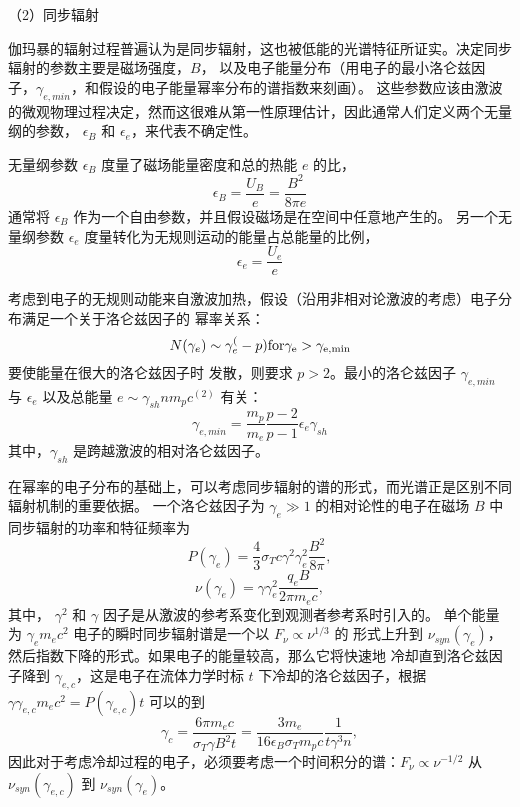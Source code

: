 	（2）同步辐射

	伽玛暴的辐射过程普遍认为是同步辐射，这也被低能的光谱特征所证实。决定同步辐射的参数主要是磁场强度，$B$，
	以及电子能量分布（用电子的最小洛仑兹因子，$\gamma_{e,min}$，和假设的电子能量幂率分布的谱指数来刻画）。
	这些参数应该由激波的微观物理过程决定，然而这很难从第一性原理估计，因此通常人们定义两个无量纲的参数，
	$\epsilon_{B}$ 和 $\epsilon_{e}$，来代表不确定性。

	无量纲参数 $\epsilon_{B}$ 度量了磁场能量密度和总的热能 $e$ 的比，
	\begin{equation}
	\epsilon_{B}=\frac{U_{B}}{e}=\frac{B^{2}}{8\pi e}
	\end{equation}
	通常将 $\epsilon_{B}$ 作为一个自由参数，并且假设磁场是在空间中任意地产生的。
	另一个无量纲参数 $\epsilon_{e}$ 度量转化为无规则运动的能量占总能量的比例，
	\begin{equation}
	\epsilon_{e}=\frac{U_{e}}{e}
	\end{equation}

	考虑到电子的无规则动能来自激波加热，假设（沿用非相对论激波的考虑）电子分布满足一个关于洛仑兹因子的
	幂率关系：
	\begin{equation}
	N(\gamma_{e})\sim \gamma_{e}^(-p) \rm{for} \gamma_{e}>\gamma_{e,min}
	\end{equation}
	要使能量在很大的洛仑兹因子时
	发散，则要求 $p>2$。最小的洛仑兹因子 $\gamma_{e,min}$ 与 $\epsilon_{e}$
	以及总能量 $e\sim \gamma_{sh}nm_{p}c^(2)$ 有关：
	\begin{equation}
	\gamma_{e,min}=\frac{m_{p}}{m_{e}}\frac{p-2}{p-1}\epsilon_{e}\gamma_{sh}
	\end{equation}
	其中，$\gamma_{sh}$ 是跨越激波的相对洛仑兹因子。

	在幂率的电子分布的基础上，可以考虑同步辐射的谱的形式，而光谱正是区别不同辐射机制的重要依据。
	一个洛仑兹因子为 $\gamma_e \gg 1$ 的相对论性的电子在磁场 $B$ 中同步辐射的功率和特征频率为
	\begin{equation}
	\label{power}
	P(\gamma_e)=\frac 4 3 \sigma_T c \gamma^2 \gamma_e^2 \frac {B^2} {8\pi},
	\end{equation}
	\begin{equation}
	\label{freq}
	\nu(\gamma_e)=\gamma \gamma_e^2 \frac {q_e B} {2 \pi m_e c},
	\end{equation}
	其中， $\gamma^2$ 和 $\gamma$ 因子是从激波的参考系变化到观测者参考系时引入的。
	单个能量为 $\gamma_{e}m_{e}c^{2}$ 电子的瞬时同步辐射谱是一个以 $F_{\nu}\propto\nu^{1/3}$ 的
	形式上升到 $\nu_{syn}(\gamma_{e})$，然后指数下降的形式。如果电子的能量较高，那么它将快速地
	冷却直到洛仑兹因子降到 $\gamma_{e,c}$，这是电子在流体力学时标 $t$ 下冷却的洛仑兹因子，根据
	$\gamma\gamma_{e,c}m_ec^2=P(\gamma_{e,c})t$ 可以的到
	\begin{equation}
	\gamma_c= \frac {6 \pi m_e c} {\sigma_T \gamma B^2 t}=
	\frac {3 m_e} {16 \epsilon_B \sigma_T m_p c} \frac 1 {t \gamma^3 n},
	\end{equation}
	因此对于考虑冷却过程的电子，必须要考虑一个时间积分的谱：$F_{\nu}\propto\nu^{-1/2}$ 从 $\nu_{syn}(\gamma_{e,c})$
	到 $\nu_{syn}(\gamma_{e})$。

